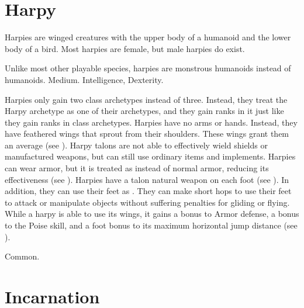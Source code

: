 \section{Harpy}\label{Harpy}
  Harpies are winged creatures with the upper body of a humanoid and the lower body of a bird.
  Most harpies are female, but male harpies do exist.

   Unlike most other playable species, harpies are monstrous humanoids instead of humanoids.
   Medium.
    Intelligence,  Dexterity.
  \begin{raggeditemize}
     Harpies only gain two class archetypes instead of three.
      Instead, they treat the Harpy archetype as one of their archetypes, and they gain ranks in it just like they gain ranks in class archetypes.
     Harpies have no arms or hands.
      Instead, they have feathered wings that sprout from their shoulders.
      These wings grant them an average  (see ).
     Harpy talons are not able to effectively wield shields or manufactured weapons, but can still use ordinary items and implements.
    Harpies can wear armor, but it is treated as  instead of normal armor, reducing its effectiveness (see ).
     Harpies have a talon natural weapon on each foot (see ).
      In addition, they can use their feet as .
      They can make short hops to use their feet to attack or manipulate objects without suffering penalties for gliding or flying.
     While a harpy is able to use its wings, it gains a  bonus to Armor defense, a  bonus to the Poise skill, and a  foot bonus to its maximum horizontal jump distance (see ).
  \end{raggeditemize}
   Common.



\section{Incarnation}\label{Incarnation}

